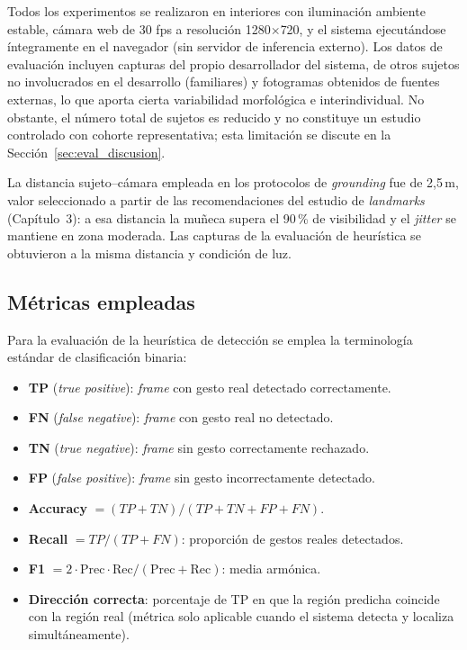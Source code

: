 \documentclass[12pt]{report} %
\begin{document}
Todos los experimentos se realizaron en interiores con iluminación ambiente estable, cámara web de 30 fps a resolución 1280$\times$720, y el sistema ejecutándose íntegramente en el navegador (sin servidor de inferencia externo). Los datos de evaluación incluyen capturas del propio desarrollador del sistema, de otros sujetos no involucrados en el desarrollo (familiares) y fotogramas obtenidos de fuentes externas, lo que aporta cierta variabilidad morfológica e interindividual. No obstante, el número total de sujetos es reducido y no constituye un estudio controlado con cohorte representativa; esta limitación se discute en la Sección~\ref{sec:eval_discusion}.

La distancia sujeto--cámara empleada en los protocolos de \textit{grounding} fue de 2{,}5\,m, valor seleccionado a partir de las recomendaciones del estudio de \textit{landmarks} (Capítulo~3): a esa distancia la muñeca supera el 90\,\% de visibilidad y el \textit{jitter} se mantiene en zona moderada. Las capturas de la evaluación de heurística se obtuvieron a la misma distancia y condición de luz.

\subsection{Métricas empleadas}

Para la evaluación de la heurística de detección se emplea la terminología estándar de clasificación binaria:
\begin{itemize}
  \item \textbf{TP} (\textit{true positive}): \textit{frame} con gesto real detectado correctamente.
  \item \textbf{FN} (\textit{false negative}): \textit{frame} con gesto real no detectado.
  \item \textbf{TN} (\textit{true negative}): \textit{frame} sin gesto correctamente rechazado.
  \item \textbf{FP} (\textit{false positive}): \textit{frame} sin gesto incorrectamente detectado.
  \item \textbf{Accuracy} $= (TP+TN)/(TP+TN+FP+FN)$.
  \item \textbf{Recall} $= TP/(TP+FN)$: proporción de gestos reales detectados.
  \item \textbf{F1} $= 2 \cdot \mathrm{Prec} \cdot \mathrm{Rec} / (\mathrm{Prec}+\mathrm{Rec})$: media armónica.
  \item \textbf{Dirección correcta}: porcentaje de TP en que la región predicha coincide con la región real (métrica solo aplicable cuando el sistema detecta y localiza simultáneamente).
\end{itemize}
\end{document}
